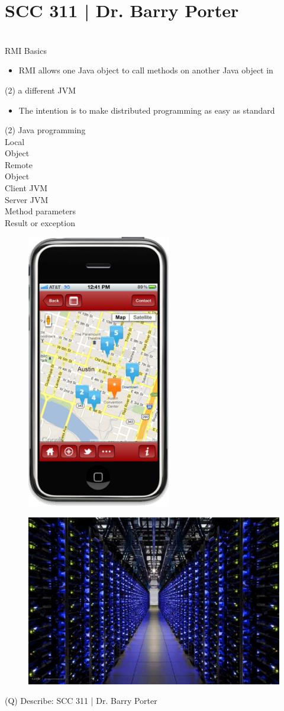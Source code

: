 \documentclass[12pt]{article}
\begin{document}
\section{SCC 311 | Dr. Barry Porter}
\\
RMI Basics\\
\begin{itemize}
  \item RMI allows one Java object to call methods on another Java object in 
\end{itemize}(2)
a different JVM\\
\begin{itemize}
  \item The intention is to make distributed programming as easy as standard 
\end{itemize}(2)
Java programming\\
Local \\
Object\\
Remote \\
Object\\
Client JVM\\
Server JVM\\
Method parameters\\
Result or exception\\
\begin{figure}[H]
\includegraphics[width=0.5\linewidth]{page26-image-1.png}
\end{figure}
\begin{figure}[H]
\includegraphics[width=0.5\linewidth]{page26-image-2.png}
\end{figure}
\clearpage
(Q)
Describe: SCC 311 | Dr. Barry Porter
\clearpage
\end{document}
